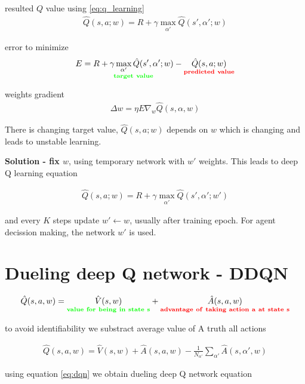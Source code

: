 \documentclass[10pt,a4paper]{article}
\begin{document}
resulted $Q$ value using \ref{eq:q_learning}
\begin{align}
  \hat{Q}(s, a; w) = R + \gamma \max \limits_{\alpha'} \hat{Q}(s', \alpha'; w)
\end{align}

error to minimize
\begin{align}
  E = \underset{\bf \color{green} target\ value}{R + \gamma \max \limits_{\alpha'} \hat{Q}(s', \alpha'; w)} - \underset{\bf \color{red} predicted\ value}{\hat{Q}(s, a; w) }
\end{align}

weights gradient
\begin{align}
  \Delta w = \eta E \nabla _w \hat{Q}(s, \alpha, w)
\end{align}

There is changing target value, $\hat{Q}(s, a; w)$ depends on $w$ which is changing and leads to unstable learning.

{\bf Solution - fix $w$}, using temporary network with $w'$ weights. This leads to deep Q learning equation

\begin{align}
  \hat{Q}(s, a; w) = R + \gamma \max \limits_{\alpha'} \hat{Q}(s', \alpha'; w')
  \label{eq:dqn}
\end{align}

and every $K$ steps update $w' \leftarrow w$, usually after training epoch.
For agent decission making, the network $w'$ is used.


\section{Dueling deep Q network - DDQN}

\begin{align}
  \hat{Q}(s, a, w) = \underset{\bf \color{green} value\ for\ being\ in\ state\ s}{\hat{V}(s, w)} + \underset{\bf \color{red} advantage\ of\ taking\ action\ a\ at\ state\ s}{\hat{A}(s, a, w)}
\end{align}

to avoid identifiability we substract average value of A truth all actions

\begin{align}
  \hat{Q}(s, a, w) = \hat{V}(s, w) + \hat{A}(s, a, w) - \frac{1}{N_{\alpha'}} \sum_{\alpha'} \hat{A}(s, \alpha', w)
\end{align}

using equation \ref{eq:dqn} we obtain dueling deep Q network equation
\end{document}
